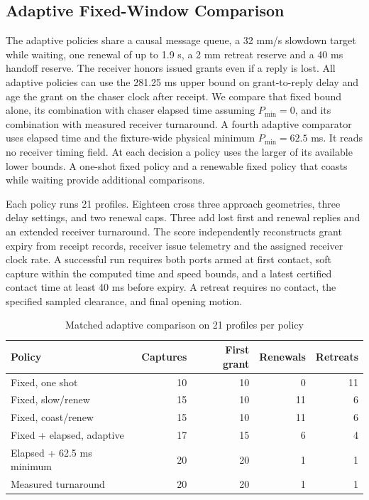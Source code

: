 \documentclass{IEEEtaes}
\begin{document}
\subsection{Adaptive Fixed-Window Comparison}

The adaptive policies share a causal message queue, a 32 mm/s slowdown target while waiting, one renewal of up to 1.9 s, a 2 mm retreat reserve and a 40 ms handoff reserve. The receiver honors issued grants even if a reply is lost. All adaptive policies can use the 281.25 ms upper bound on grant-to-reply delay and age the grant on the chaser clock after receipt. We compare that fixed bound alone, its combination with chaser elapsed time assuming $P_{\min}=0$, and its combination with measured receiver turnaround. A fourth adaptive comparator uses elapsed time and the fixture-wide physical minimum $P_{\min}=62.5$ ms. It reads no receiver timing field. At each decision a policy uses the larger of its available lower bounds. A one-shot fixed policy and a renewable fixed policy that coasts while waiting provide additional comparisons.

Each policy runs 21 profiles. Eighteen cross three approach geometries, three delay settings, and two renewal caps. Three add lost first and renewal replies and an extended receiver turnaround. The score independently reconstructs grant expiry from receipt records, receiver issue telemetry and the assigned receiver clock rate. A successful run requires both ports armed at first contact, soft capture within the computed time and speed bounds, and a latest certified contact time at least 40 ms before expiry. A retreat requires no contact, the specified sampled clearance, and final opening motion.

\begin{table}[!t]
\caption{Matched adaptive comparison on 21 profiles per policy}
\label{tab:adaptive}
\centering
\small
\setlength{\tabcolsep}{3.8pt}
\begin{tabular}{@{}lrrrr@{}}
\toprule
Policy & Captures & First grant & Renewals & Retreats\\
\midrule
Fixed, one shot   & 10 & 10 &  0 & 11\\
Fixed, slow/renew & 15 & 10 & 11 &  6\\
Fixed, coast/renew& 15 & 10 & 11 &  6\\
Fixed + elapsed, adaptive & 17 & 15 & 6 & 4\\
Elapsed + 62.5 ms minimum & 20 & 20 & 1 & 1\\
Measured turnaround & 20 & 20 & 1 & 1\\
\bottomrule
\end{tabular}
\end{table}
\end{document}
